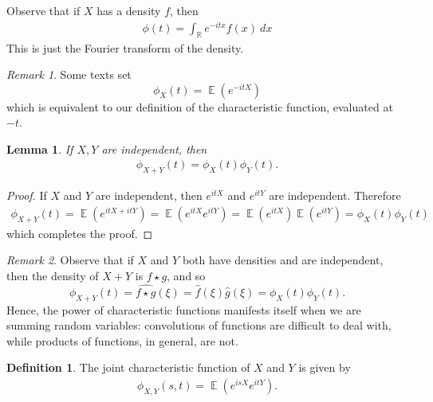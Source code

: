 \documentclass[12pt]{article}
\newcommand{\rr}{\mathbb{R}}
\newcommand{\wh}{\widehat}
\DeclareMathOperator{\ex}{\mathbb{E}}
\theoremstyle{plain}
\newtheorem{lemma}[theorem]{Lemma}
\theoremstyle{definition}
\newtheorem*{definition}{Definition}
\theoremstyle{remark}
\newtheorem*{remark}{Remark}
\numberwithin{equation}{section}  %
\begin{document}
Observe that if $X$ has a density $f$, then
\begin{equation*}
\begin{split}
	\phi(t) = \int_{\rr} e^{-itx} f(x) \ dx
\end{split}
\end{equation*}
This is just the Fourier transform of the density. 
\begin{framed}
\begin{remark}
Some texts set
\[\phi_{X}(t) = \ex(e^{-itX})\]
which is equivalent to our definition
of the characteristic function, evaluated at $-t$. 
\end{remark}
\end{framed}
\begin{lemma}\label{lem:indep}
If $X, Y$ are independent, then
\begin{equation*}
\begin{split}
	\phi_{X + Y}(t) = \phi_{X}(t) \phi_{Y}(t).
\end{split}
\end{equation*}
\end{lemma}
\begin{proof}
	If $X$ and $Y$ are independent, then $e^{itX}$ and $e^{itY}$ are independent.
	Therefore
	\begin{equation*}
	\begin{split}
		\phi_{X + Y}(t) = \ex(e^{itX + itY}) = \ex(e^{itX} e^{itY})
		= \ex(e^{itX}) \ex (e^{itY}) = \phi_{X}(t) \phi_{Y}(t)
	\end{split}
	\end{equation*}
	which completes the proof.
\end{proof}
\begin{framed}
\begin{remark}
Observe that if $X$ and $Y$ both have densities and are independent, then 
the density of $X + Y$ is $f \star g$, and so 
\[\phi_{X + Y}(t) = \wh{f \star g}(\xi) = \wh{f}(\xi) \wh{g}(\xi) =
\phi_{X}(t) \phi_{Y}(t).\]
Hence, the power of characteristic functions manifests itself when
we are summing random variables: convolutions of functions are difficult to deal
with, while products of functions, in general, are not. 
\end{remark}
\end{framed}
\begin{definition}
The joint characteristic function of $X$ and $Y$ is given by
\begin{equation*}
\begin{split}
	\phi_{X,Y}(s,t) = \ex(e^{isX} e^{itY}).
\end{split}
\end{equation*}
\end{definition}
\end{document}

